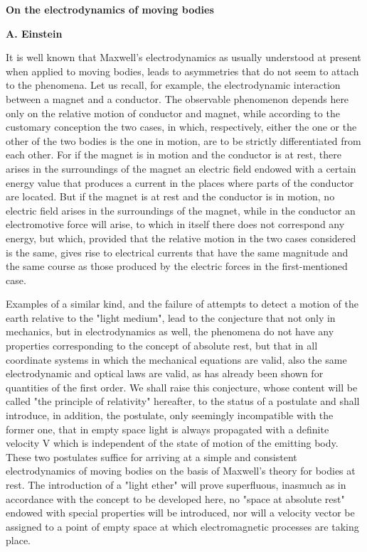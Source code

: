 ﻿\documentclass{article} %
\begin{document}
\begin{center}
\Huge
\textbf{On the electrodynamics of moving bodies}
\end{center}
\begin{center}
\textbf{A. Einstein}
\end{center}


It is well known that Maxwell's electrodynamics as usually understood at present when applied to moving bodies, leads to asymmetries that do not seem to attach to the phenomena. 
Let us recall, for example, the electrodynamic interaction between a magnet and a conductor. 
The observable phenomenon depends here only on the relative motion of conductor and magnet, while according to the customary conception the two cases, in which, respectively, either the one or the other of the two bodies is the one in motion, are to be strictly differentiated from each other. 
For if the magnet is in motion and the conductor is at rest, there arises in the surroundings of the magnet an electric field endowed with a certain energy value that produces a current in the places where parts of the conductor are located. 
But if the magnet is at rest and the conductor is in motion, no electric field arises in the surroundings of the magnet, while in the conductor an electromotive force will arise, to which in itself there does not correspond any energy, but which, provided that the relative motion in the two cases considered is the same, gives rise to electrical currents that have the same magnitude and the same course as those produced by the electric forces in the first-mentioned case. 

Examples of a similar kind, and the failure of attempts to detect a motion of the earth relative to the "light medium", lead to the conjecture that not only in mechanics, but in electrodynamics as well, the phenomena do not have any properties corresponding to the concept of absolute rest, but that in all coordinate systems in which the mechanical equations are valid, also the same electrodynamic and optical laws are valid, as has already been shown for quantities of the first order. 
We shall raise this conjecture, whose content will be called "the principle of relativity" hereafter, to the status of a postulate and shall introduce, in addition, the postulate, only seemingly incompatible with the former one, that in empty space light is always propagated with a definite velocity V which is independent of the state of motion of the emitting body. 
These two postulates suffice for arriving at a simple and consistent electrodynamics of moving bodies on the basis of Maxwell's theory for bodies at rest. 
The introduction of a "light ether" will prove superfluous, inasmuch as in accordance with the concept to be developed here, no "space at absolute rest" endowed with special properties will be introduced, nor will a velocity vector be assigned to a point of empty space at which electromagnetic processes are taking place. 
\end{document}
